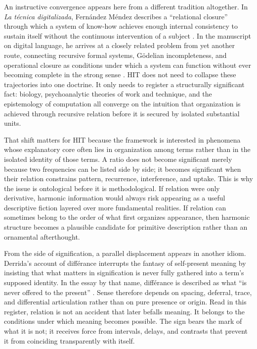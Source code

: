 An instructive convergence appears here from a different tradition altogether. In \emph{La t\'ecnica digitalizada}, Fern\'andez M\'endez describes a \enquote{relational closure} through which a system of know-how achieves enough internal consistency to sustain itself without the continuous intervention of a subject \parencite{fernandez_2021b}. In the manuscript on digital language, he arrives at a closely related problem from yet another route, connecting recursive formal systems, G\"odelian incompleteness, and operational closure as conditions under which a system can function without ever becoming complete in the strong sense \parencite{fernandez_sf_digital}. HIT does not need to collapse these trajectories into one doctrine. It only needs to register a structurally significant fact: biology, psychoanalytic theories of work and technique, and the epistemology of computation all converge on the intuition that organization is achieved through recursive relation before it is secured by isolated substantial units.

That shift matters for HIT because the framework is interested in phenomena whose explanatory core often lies in organization among terms rather than in the isolated identity of those terms. A ratio does not become significant merely because two frequencies can be listed side by side; it becomes significant when their relation constrains pattern, recurrence, interference, and uptake. This is why the issue is ontological before it is methodological. If relation were only derivative, harmonic information would always risk appearing as a useful descriptive fiction layered over more fundamental realities. If relation can sometimes belong to the order of what first organizes appearance, then harmonic structure becomes a plausible candidate for primitive description rather than an ornamental afterthought.

From the side of signification, a parallel displacement appears in another idiom. Derrida's account of différance interrupts the fantasy of self-present meaning by insisting that what matters in signification is never fully gathered into a term's supposed identity. In the essay by that name, différance is described as what \enquote{is never offered to the present} \parencite{derrida_1982}. Sense therefore depends on spacing, deferral, trace, and differential articulation rather than on pure presence or origin. Read in this register, relation is not an accident that later befalls meaning. It belongs to the conditions under which meaning becomes possible. The sign bears the mark of what it is not; it receives force from intervals, delays, and contrasts that prevent it from coinciding transparently with itself.

